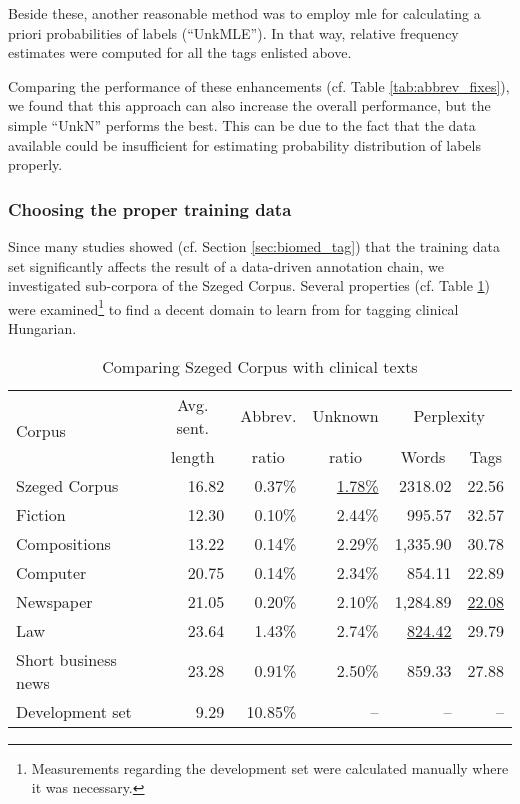 Beside these, another reasonable method was to employ \acrlong{mle} for calculating a priori probabilities of labels (``UnkMLE''). 
In that way, relative frequency estimates were computed for all the tags enlisted above.

Comparing the performance of these enhancements (cf. Table \ref{tab:abbrev_fixes}), we found that this approach can also increase the overall performance, but the simple ``UnkN'' performs the best.
This can be due to the fact that the data available could be insufficient for estimating probability distribution of labels properly.

\subsubsection{Choosing the proper training data}

Since many studies showed (cf. Section \ref{sec:biomed_tag}) that the training data set significantly affects the result of a data-driven annotation chain, we investigated sub-corpora of the Szeged Corpus. 
Several properties (cf. Table \ref{tab:subcorpora_attrib}) were examined\footnote{Measurements regarding the development set were calculated manually where it was necessary.} to find a decent domain to learn from for tagging clinical Hungarian. 

\begin{table}[H]
\centering
\caption{Comparing Szeged Corpus with clinical texts}
\label{tab:subcorpora_attrib}
\begin{tabular}{ l r r r r r } 
\hline
\multicolumn{1}{l}{\multirow{2}{*}{Corpus}} & \multicolumn{1}{c}{Avg. sent.} & \multicolumn{1}{c}{Abbrev.}  &  \multicolumn{1}{c}{Unknown} & \multicolumn{2}{c}{Perplexity} \\
 & \multicolumn{1}{c}{length} & \multicolumn{1}{c}{ratio} &  \multicolumn{1}{c}{ratio} & \multicolumn{1}{c}{Words} & \multicolumn{1}{c}{Tags} \\
\hline
Szeged Corpus & 16.82 & 0.37\%  & \underline{1.78\%} & 2318.02 & 22.56\\
\hspace{0.2cm} Fiction & 12.30 & 0.10\% & 2.44\% & 995.57 & 32.57\\
\hspace{0.2cm} Compositions & 13.22 & 0.14\% & 2.29\% & 1,335.90 & 30.78\\
\hspace{0.2cm} Computer & 20.75 & 0.14\% & 2.34\% & 854.11 & 22.89\\
\hspace{0.2cm} Newspaper & 21.05 & 0.20\% & 2.10\% & 1,284.89 & \underline{22.08}\\
\hspace{0.2cm} Law & 23.64 & 1.43\% & 2.74\% & \underline{824.42} & 29.79\\
\hspace{0.2cm} Short business news & 23.28 & 0.91\% & 2.50\% & 859.33 & 27.88\\
Development set & 9.29 & 10.85\% & -- & -- & -- \\
\hline
\end{tabular}
\end{table}


